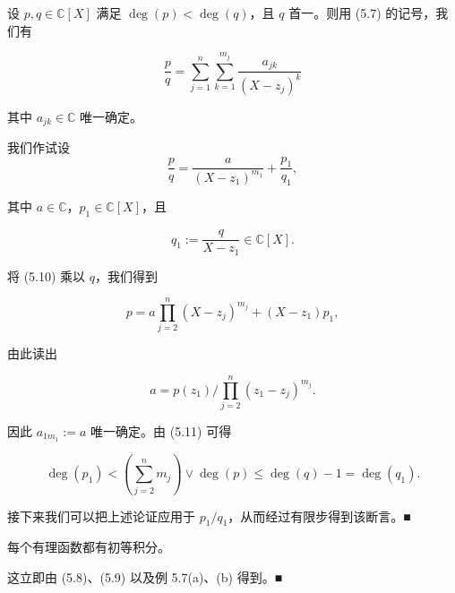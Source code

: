 \begin{proposition}

设 $ p, q \in \mathbb{C}[X] $ 满足 $ \deg(p) < \deg(q) $，且 $ q $ 首一。则用 (5.7) 的记号，我们有

\begin{equation}
\frac{p}{q} = \sum_{j=1}^{n} \sum_{k=1}^{m_j} \frac{a_{jk}}{(X - z_j)^k}\tag{5.9}
\end{equation}

其中 $ a_{jk} \in \mathbb{C} $ 唯一确定。

\proofhead
我们作试设
\begin{equation}
\frac{p}{q} = \frac{a}{(X - z_1)^{m_1}} + \frac{p_1}{q_1} ,\tag{5.10}
\end{equation}

其中 $ a \in \mathbb{C} $，$ p_1 \in \mathbb{C}[X] $，且

\[
q_1 := \frac{q}{X - z_1} \in \mathbb{C}[X] .
\]

将 (5.10) 乘以 $ q $，我们得到

\begin{equation}
p = a \prod_{j=2}^{n} (X - z_j)^{m_j} + (X - z_1) p_1 ,\tag{5.11}
\end{equation}

由此读出

\begin{equation}
a = p(z_1) / \prod_{j=2}^{n} (z_1 - z_j)^{m_j} .\tag{5.12}
\end{equation}

因此 $ a_{1 m_1} := a $ 唯一确定。由 (5.11) 可得

\[
\deg(p_1) < \left( \sum_{j=2}^{n} m_j \right) \vee \deg(p) \le \deg(q) - 1 = \deg(q_1) .
\]

接下来我们可以把上述论证应用于 $ p_1/q_1 $，从而经过有限步得到该断言。\nobreak\hspace{0.35em}■

\end{proposition}

\begin{corollary}

每个有理函数都有初等积分。

\proofhead
这立即由 (5.8)、(5.9) 以及例 5.7(a)、(b) 得到。\nobreak\hspace{0.35em}■
\end{corollary}

